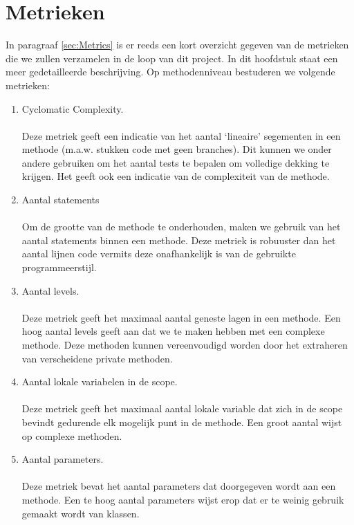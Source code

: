 \appendix
\chapter{Metrieken} \label{chap:Metrics}
In paragraaf \ref{sec:Metrics} is er reeds een kort overzicht gegeven van de metrieken die we zullen verzamelen in de loop van dit project. In dit hoofdstuk staat een meer gedetailleerde beschrijving. Op methodenniveau bestuderen we volgende metrieken:
\begin{enumerate}
	\item 
		Cyclomatic Complexity.
		\\
		\\
		Deze metriek geeft een indicatie van het aantal `lineaire' segementen in een methode (m.a.w. stukken code met geen branches). Dit kunnen we onder andere gebruiken om het aantal tests te bepalen om volledige dekking te krijgen. Het geeft ook een indicatie van de complexiteit van de methode.
		
	\item 
		Aantal statements
		\\
		\\
		Om de grootte van de methode te onderhouden, maken we gebruik van het aantal statements binnen een methode. Deze metriek is robuuster dan het aantal lijnen code vermits deze onafhankelijk is van de gebruikte programmeerstijl.
	\item
		Aantal levels.
		\\
		\\
		Deze metriek geeft het maximaal aantal geneste lagen in een methode. Een hoog aantal levels geeft aan dat we te maken hebben met een complexe  methode. Deze methoden kunnen vereenvoudigd worden door het extraheren van verscheidene private methoden.
	
	\item
		Aantal lokale variabelen in de scope.
		\\
		\\
		Deze metriek geeft het maximaal aantal lokale variable dat zich in de scope bevindt gedurende elk mogelijk punt in de methode. Een groot aantal wijst op complexe methoden.
	\item
		Aantal parameters.
		\\
		\\
		Deze metriek bevat het aantal parameters dat doorgegeven wordt aan een methode. Een te hoog aantal parameters wijst erop dat er te weinig gebruik gemaakt wordt van klassen.
	

\end{enumerate}
